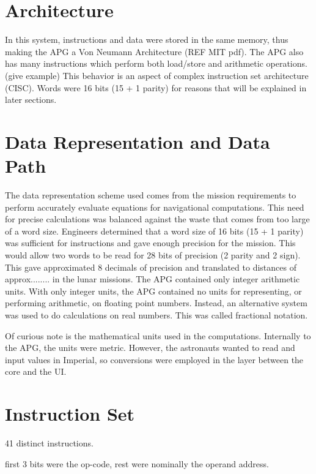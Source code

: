 \documentclass[a4paper,11pt]{article}
\begin{document}
\section{Architecture}
In this system, instructions and data were stored in the same memory, thus making the APG a Von Neumann Architecture (REF MIT pdf).  
The APG also has many instructions which perform both load/store and arithmetic operations. (give example) This behavior is an aspect of complex instruction set  architecture (CISC).  Words were 16 bits (15 + 1 parity) for reasons that will be explained in later sections.  


\section{Data Representation and Data Path}
The data representation scheme used comes from the mission requirements to perform accurately evaluate equations for navigational computations.  This need for precise calculations was balanced against the waste that comes from too large of a word size.  Engineers determined that a word size of 16 bits (15 + 1 parity) was sufficient for instructions and gave enough precision for the mission.  This would allow two words to be read for 28 bits of precision (2 parity and 2 sign).  This gave approximated 8 decimals of precision and translated to distances of approx........ in the lunar missions.
The APG contained only integer arithmetic units.  
With only integer units, the APG contained no units for representing, or performing arithmetic, on floating point numbers.   Instead, an alternative system was used to do calculations on real numbers.  This was called fractional notation.  

Of curious note is the mathematical units used in the computations.  Internally to the APG, the units were metric.  However, the astronauts wanted to read and input values in Imperial, so conversions were employed in the layer between the core and the UI.


\section{Instruction Set}
41 distinct instructions.

first 3 bits were the op-code, rest were nominally the operand address. 
\end{document}
